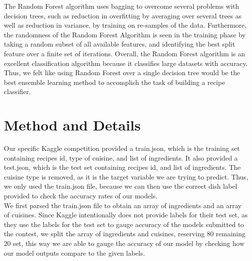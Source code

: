 \documentclass[11pt]{article}
\begin{document}
The Random Forest algorithm uses bagging to overcome several problems with decision
trees, such as reduction in overfitting by averaging over several trees as well
as reduction in variance, by training on re-samples of the data. Furthermore,
the randomness of the Random Forest Algorithm is seen in the training phase by taking a random subset
of all available features, and identifying the best split feature over a finite set
of iterations. Overall, the Random Forest algorithm is an excellent classification
algorithm because it classifies large datasets with accuracy.
Thus, we felt like using Random Forest over a single decision tree would be
the best ensemble learning method to accomplish the task of building a
recipe classifier. \\

\section{Method and Details}

Our specific Kaggle competition provided a train.json, which is the training
set containing recipes id, type of cuisine, and list of ingredients. It also
provided a test.json, which is the test set containing recipes id, and list of
ingredients. The cuisine type is removed, as it is the target variable we
are trying to predict. Thus, we only used the train.json file, because we can then
use the correct dish label provided to check the accuracy rates of our models. \\

We first parsed the train.json file to obtain an array of ingredients and an
array of cuisines. Since Kaggle intentionally does not provide labels for their test
set, as they use the labels for the test set to gauge
accuracy of the models submitted to the contest, we split the array of ingredients and cuisines,
reserving 80%
remaining 20%
set, this way we are able to gauge the accuracy of our model by checking how our model outputs
compare to the given labels. \\
\end{document}
